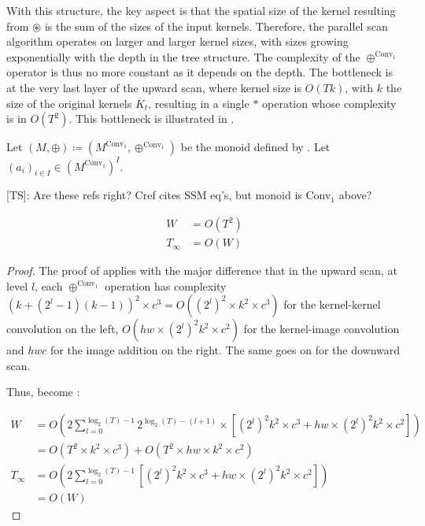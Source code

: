 \documentclass{article}
\newcommand{\TS}[1]{{\color{pink}[TS]: #1}}
\begin{document}
With this structure, the key aspect is that the spatial size of the kernel resulting from $\circledast$ is the sum of the sizes of the input kernels. Therefore, the parallel scan algorithm operates on larger and larger kernel sizes, with sizes growing exponentially with the depth in the tree structure. The complexity of the $\oplus^{\mathrm{Conv}_1}$ operator is thus no more constant as it depends on the depth. The bottleneck is at the very last layer of the upward scan, where kernel size is $O(Tk)$, with $k$ the size of the original kernels $\overline{K}_t$, resulting in a single $\ast$ operation whose complexity is in $O(T^2)$. This bottleneck is illustrated in .

\begin{proposition}
    Let $(M, \oplus) \coloneqq (M^{\mathrm{Conv}_1}, \oplus^{\mathrm{Conv}_1})$ be the monoid defined by . Let $(a_i)_{i\in I}\in (M^{\mathrm{Conv}_1})^I$.

\TS{Are these refs right? Cref cites SSM eq’s, but monoid is Conv$_1$ above?}

\begin{align}
    W&= O(T^2)\\
    T_\infty&= O(W)
\end{align}
\end{proposition}

\begin{proof}
The proof of  applies with the major difference that in the upward scan, at level $l$, each $\oplus^{\mathrm{Conv}_1}$ operation has complexity $(k+(2^l-1)(k-1))^2 \times c^3 = O((2^l)^2\times k^2 \times c^3)$ for the kernel-kernel convolution on the left, $O(h w \times (2^l)^2 k^2 \times c^2)$ for the kernel-image convolution and $h w c$ for the image addition on the right. The same goes on for the downward scan.

Thus,  become :

\begin{align}
\label{eq:W_conv}
W &= O(2 \sum_{l=0}^{\log_2(T)-1} 2^{\log_2(T)-(l+1)} \times \left[ (2^l)^2 k^2 \times c^3 + h w \times (2^l)^2 k^2 \times c^2\right])\\
&= O(T^2 \times k^2 \times c^3) + O(T^2 \times h w \times k^2 \times c^2)\\
\label{eq:T_conv}
T_\infty&= O(2\sum_{l=0}^{\log_2(T)-1} \left[ (2^l)^2 k^2 \times c^3 + h w \times (2^l)^2 k^2 \times c^2\right])\\
&= O(W)
\end{align}
\end{proof}
\end{document}

